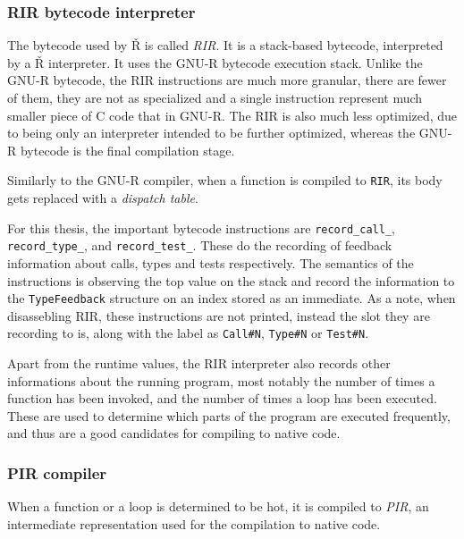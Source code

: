\subsubsection*{RIR bytecode interpreter}

The bytecode used by Ř is called \textit{RIR}. It is a stack-based bytecode, interpreted by a Ř interpreter. It uses the GNU-R bytecode execution stack. Unlike the GNU-R bytecode, the RIR instructions are much more granular, there are fewer of them, they are not as specialized and a single instruction represent much smaller piece of C code that in GNU-R. The RIR is also much less optimized, due to being only an interpreter intended to be further optimized, whereas the GNU-R bytecode is the final compilation stage.

Similarly to the GNU-R compiler, when a function is compiled to \texttt{RIR}, its body gets replaced with a \textit{dispatch table}.


For this thesis, the important bytecode instructions are \texttt{record\_call\_}, \texttt{record\_type\_}, and \texttt{record\_test\_}. These do the recording of feedback information about calls, types and tests respectively. The semantics of the instructions is observing the top value on the stack and record the information to the \texttt{TypeFeedback} structure on an index stored as an immediate. As a note, when disassebling RIR, these instructions are not printed, instead the slot they are recording to is, along with the label as \texttt{Call\#N}, \texttt{Type\#N} or \texttt{Test\#N}.

Apart from the runtime values, the RIR interpreter also records other informations about the running program, most notably the number of times a function has been invoked, and the number of times a loop has been executed. These are used to determine which parts of the program are executed frequently, and thus are a good candidates for compiling to native code.

\subsubsection*{PIR compiler}
When a function or a loop is determined to be hot, it is compiled to \textit{PIR}, an intermediate representation used for the compilation to native code.


